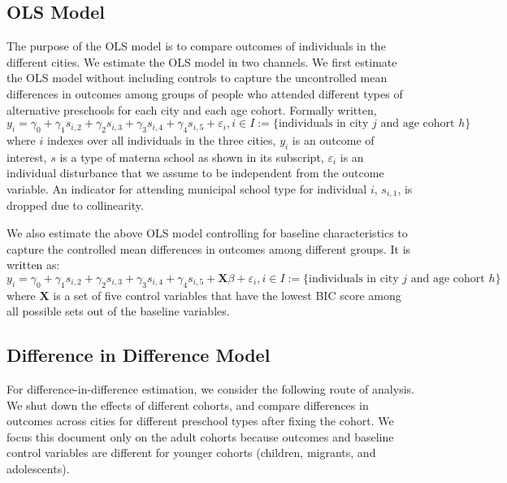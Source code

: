 \documentclass[11pt]{article}
\begin{document}
\subsection{OLS Model}
The purpose of the OLS model is to compare outcomes of individuals in the different cities. We estimate the OLS model in two channels. We first estimate the OLS model without including controls to capture the uncontrolled mean differences in outcomes among groups of people who attended different types of alternative preschools for each city and each age cohort. Formally written,
\begin{equation} \label{OLS-nocontrol}
	y_{i} = \gamma_0 + \gamma_1 s_{i,2} + \gamma_2 s_{i,3} + \gamma_3 s_{i,4} + \gamma_4 s_{i,5} + \varepsilon_{i}, i \in I := \{ \text{individuals in city $j$ and age cohort $h$}\}
\end{equation}
\noindent where $i$ indexes over all individuals in the three cities, $y_{i}$ is an outcome of interest, $s$ is a type of materna school as shown in its subscript, $\varepsilon_{i}$ is an individual disturbance that we assume to be independent from the outcome variable. An indicator for attending municipal school type for individual $i$, $s_{i,1}$, is dropped due to collinearity. 

We also estimate the above OLS model controlling for baseline characteristics to capture the controlled mean differences in outcomes among different groups. It is written as:
\begin{equation} \label{OLS-control}
	y_{i} = \gamma_0 + \gamma_1 s_{i,2} + \gamma_2 s_{i,3} + \gamma_3 s_{i,4} + \gamma_4 s_{i,5} + \mathbf{X}\beta + \varepsilon_{i}, i \in I := \{ \text{individuals in city $j$ and age cohort $h$}\}	
\end{equation}
where $\mathbf{X}$ is a set of five control variables that have the lowest BIC score among all possible sets out of the baseline variables. 


\subsection{Difference in Difference Model}
For difference-in-difference estimation, we consider the following route of analysis. We shut down the effects of different cohorts, and compare differences in outcomes across cities for different preschool types after fixing the cohort. We focus this document only on the adult cohorts because outcomes and baseline control variables are different for younger cohorts (children, migrants, and adolescents). 
\end{document}
